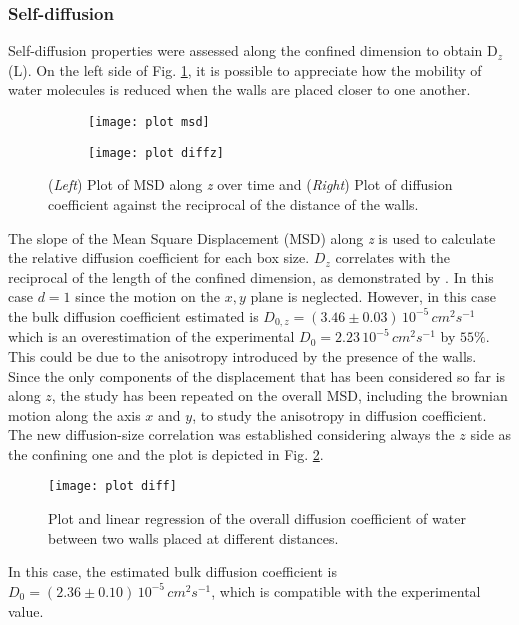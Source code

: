 \documentclass[
	12pt, %
]{fphw}
\begin{document}
\subsubsection{Self-diffusion}
Self-diffusion properties were assessed along the confined dimension to obtain D$_{z}$(L).
On the left side of Fig. \ref{diffz}, it is possible to appreciate how the mobility of water molecules is reduced when the walls are placed closer to one another.
\begin{figure}[h!]
	\centering
	\begin{subfigure}{0.45\textwidth}
		\texttt{[image: plot msd]}
	\end{subfigure}
	\begin{subfigure}{0.45\textwidth}
		\texttt{[image: plot diffz]}
	\end{subfigure}	
	\caption{(\textit{Left}) Plot of MSD along \textit{z} over time and (\textit{Right}) Plot of diffusion coefficient against the reciprocal of the distance of the walls.}
	\label{diffz}
\end{figure}
The slope of the Mean Square Displacement (MSD) along \textit{z} is used to calculate the relative diffusion coefficient for each box size.
$D_{z}$ correlates with the reciprocal of the length of the confined dimension, as demonstrated by \citet{yeh_system-size_2004}.
In this case $d = 1$ since the motion on the $x,y$ plane is neglected.
However, in this case the bulk diffusion coefficient estimated is  $D_{0,z} = (3.46 \pm 0.03)\, 10^{-5} \, cm^{2} s^{-1}$ which is an overestimation of the experimental $D_{0} = 2.23 \, 10^{-5}\, cm^{2} s^{-1}$\cite{mills_self-diffusion_1973} by $55\%$.
This could be due to the anisotropy introduced by the presence of the walls.
Since the only components of the displacement that has been considered so far is along $z$, the study has been repeated on the overall MSD, including the brownian motion along the axis $x$ and $y$, to study the anisotropy in diffusion coefficient.
The new diffusion-size correlation was established considering always the $z$ side as the confining one and the plot is depicted in Fig. \ref{diff}.
\begin{figure}
	\centering
	\texttt{[image: plot diff]}
	\caption{Plot and linear regression of the overall diffusion coefficient of water between two walls placed at different distances.}
	\label{diff}
\end{figure}
In this case, the estimated bulk diffusion coefficient is $D_{0} = (2.36 \pm 0.10)\, 10^{-5} \, cm^{2} s^{-1}$, which is compatible with the experimental value.
\end{document}
